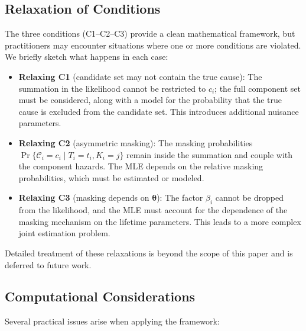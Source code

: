 \documentclass[11pt]{article}
\theoremstyle{definition}
\theoremstyle{plain}
\renewcommand{\v}[1]{\boldsymbol{#1}}
\newcommand{\btheta}{\v{\theta}}
\begin{document}
\subsection{Relaxation of Conditions}
\label{sec:relaxations}

The three conditions (C1--C2--C3) provide a clean mathematical framework,
but practitioners may encounter situations where one or more conditions
are violated.
We briefly sketch what happens in each case:

\begin{itemize}
    \item \textbf{Relaxing C1} (candidate set may not contain the true
    cause): The summation in the likelihood cannot be restricted to
    $c_i$; the full component set must be considered, along with a model
    for the probability that the true cause is excluded from the candidate
    set.
    This introduces additional nuisance parameters.

    \item \textbf{Relaxing C2} (asymmetric masking): The masking
    probabilities $\Pr\{\mathcal{C}_i = c_i \mid T_i = t_i, K_i = j\}$
    remain inside the summation and couple with the component hazards.
    The MLE depends on the relative masking probabilities, which must
    be estimated or modeled.

    \item \textbf{Relaxing C3} (masking depends on $\btheta$): The
    factor $\beta_i$ cannot be dropped from the likelihood, and the MLE
    must account for the dependence of the masking mechanism on the
    lifetime parameters.
    This leads to a more complex joint estimation problem.
\end{itemize}

Detailed treatment of these relaxations is beyond the scope of this
paper and is deferred to future work.

\subsection{Computational Considerations}
\label{sec:computational}

Several practical issues arise when applying the framework:
\end{document}

